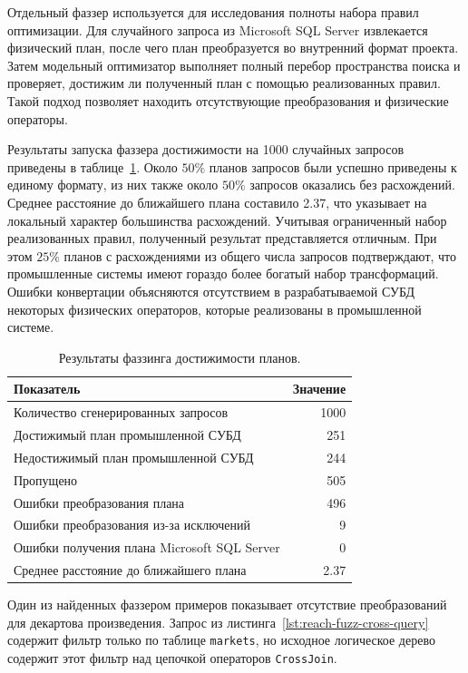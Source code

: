 \documentclass[14pt, russian]{scrartcl}
\begin{document}
Отдельный фаззер используется для исследования полноты набора правил
оптимизации. Для случайного запроса из Microsoft SQL Server извлекается
физический план, после чего план преобразуется во внутренний формат проекта.
Затем модельный оптимизатор выполняет полный перебор пространства поиска и
проверяет, достижим ли полученный план с помощью реализованных правил. Такой
подход позволяет находить отсутствующие преобразования и физические операторы.

Результаты запуска фаззера достижимости на 1000 случайных запросов приведены в
таблице~\ref{tbl:reachability-fuzz-results}. Около $50\%$ планов запросов были
успешно приведены к единому формату, из них также около $50\%$ запросов
оказались без расхождений. Среднее расстояние до ближайшего плана составило
2.37, что указывает на локальный характер большинства расхождений. Учитывая
ограниченный набор реализованных правил, полученный результат представляется
отличным. При этом $25\%$ планов с расхождениями из общего числа запросов
подтверждают, что промышленные системы имеют гораздо более богатый набор
трансформаций. Ошибки конвертации объясняются отсутствием в разрабатываемой СУБД
некоторых физических операторов, которые реализованы в промышленной системе.

\begin{table}[H]
  \centering
  \caption{Результаты фаззинга достижимости планов.}
  \label{tbl:reachability-fuzz-results}
  \begin{tabular}{|l|r|}
    \hline
    Показатель & Значение \\
    \hline
    Количество сгенерированных запросов & 1000 \\
    Достижимый план промышленной СУБД & 251 \\
    Недостижимый план промышленной СУБД & 244 \\
    Пропущено & 505 \\
    Ошибки преобразования плана & 496 \\
    Ошибки преобразования из-за исключений & 9 \\
    Ошибки получения плана Microsoft SQL Server & 0 \\
    Среднее расстояние до ближайшего плана & 2.37 \\
    \hline
  \end{tabular}
\end{table}

Один из найденных фаззером примеров показывает отсутствие преобразований для
декартова произведения. Запрос из листинга~\ref{lst:reach-fuzz-cross-query}
содержит фильтр только по таблице \verb|markets|, но исходное логическое дерево
содержит этот фильтр над цепочкой операторов \verb|CrossJoin|.
\end{document}
